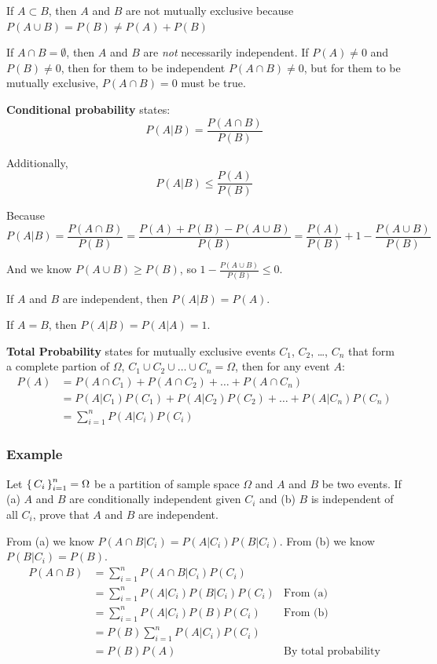 \documentclass{report}
\begin{document}
If $A \subset B$, then $A$ and $B$ are not mutually exclusive because $P(A \cup B) = P(B) \neq P(A) + P(B)$

If $A \cap B = \emptyset$, then $A$ and $B$ are \textit{not} necessarily independent. If $P(A) \neq 0$ and $P(B) \neq 0$, then for them to be independent $P(A\cap B) \neq 0$, but for them to be mutually exclusive, $P(A \cap B) = 0$  must be true.

\textbf{Conditional probability} states: $$P(A|B) = \frac{P(A \cap B)}{P(B)}$$

Additionally, $$P(A|B) \leq  \frac{P(A)}{P(B)}$$

Because $$P(A|B) = \frac{P(A \cap B)}{P(B)} = \frac{P(A) + P(B) - P(A \cup B)}{P(B)} = \frac{P(A)}{P(B)} + 1 - \frac{P(A \cup B)}{P(B)}$$

And we know $P(A \cup B) \geq P(B)$, so $1 - \frac{P(A \cup B)}{P(B)} \leq 0$.  

If $A$ and $B$ are independent, then $P(A|B) = P(A)$.

If $A = B$, then $P(A|B) = P(A|A) = 1$.

\textbf{Total Probability} states for mutually exclusive events $C_1$, $C_2$, \dots, $C_n$ that form a complete partion of $\Omega$, $C_1 \cup C_2 \cup \dots \cup C_n = \Omega$, then for any event $A$: \begin{align*}
P(A) & = P(A \cap C_1) + P(A \cap C_2) + \dots + P(A \cap C_n) \\
& = P(A|C_1)P(C_1) + P(A|C_2)P(C_2) + \dots + P(A|C_n)P(C_n) \\
& = \sum_{i=1}^n P(A|C_i)P(C_i)
\end{align*}

\subsubsection*{Example}

Let $\set{C_i}_{i=1}^n = \Omega$ be a partition of sample space $\Omega$ and $A$ and $B$ be two events. If (a) $A$ and $B$ are conditionally independent given $C_i$ and (b) $B$ is independent of all $C_i$, prove that $A$ and $B$ are independent.

From (a) we know $P(A \cap B|C_i) = P(A|C_i)P(B|C_i)$. From (b) we know $P(B|C_i) = P(B)$. \begin{align*}
P(A \cap B) & = \sum_{i=1}^n P(A \cap B|C_i)P(C_i) \\
& = \sum_{i=1}^n P(A|C_i) P(B|C_i) P(C_i) & \text{From (a)} \\
& = \sum_{i=1}^n P(A|C_i) P(B)P(C_i) & \text{From (b)} \\
& = P(B) \sum_{i=1}^n P(A|C_i)P(C_i) \\
& = P(B) P(A) & \text{By total probability} 
\end{align*}
\end{document}

